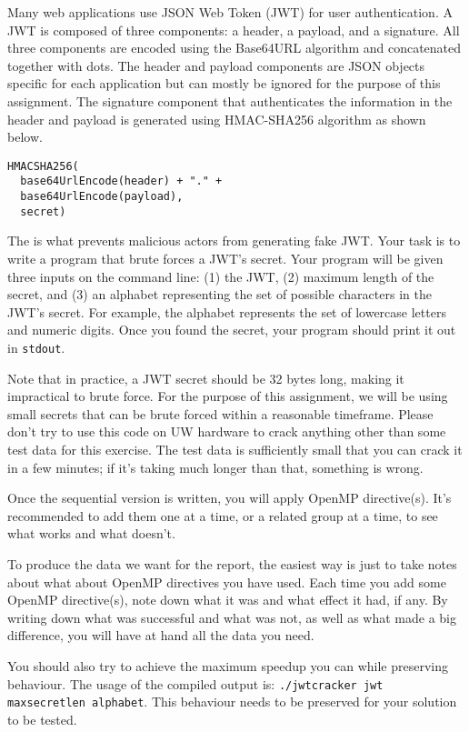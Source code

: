 \documentclass[letterpaper,10pt]{article}
\begin{document}
Many web applications use JSON Web Token (JWT) for user authentication. A JWT is composed of three components: a header, a payload, and a signature. All three components are encoded using the Base64URL algorithm and concatenated together with dots. The header and payload components are JSON objects specific for each application but can mostly be ignored for the purpose of this assignment. The signature component that authenticates the information in the header and payload is generated using HMAC-SHA256 algorithm as shown below.

\begin{verbatim}
HMACSHA256(
  base64UrlEncode(header) + "." +
  base64UrlEncode(payload),
  secret)
\end{verbatim}

The  is what prevents malicious actors from generating fake JWT. Your task is to write a program that brute forces a JWT's secret. Your program will be given three inputs on the command line: (1) the JWT, (2) maximum length of the secret, and (3) an alphabet representing the set of possible characters in the JWT's secret. For example, the alphabet  represents the set of lowercase letters and numeric digits. Once you found the secret, your program should print it out in \texttt{stdout}.

Note that in practice, a JWT secret should be 32 bytes long, making it impractical to brute force. For the purpose of this assignment, we will be using small secrets that can be brute forced within a reasonable timeframe. Please don't try to use this code on UW hardware to crack anything other than some test data for this exercise. The test data is sufficiently small that you can crack it in a few minutes; if it's taking much longer than that, something is wrong.

Once the sequential version is written, you will apply OpenMP directive(s). It's recommended to add them one at a time, or a related group at a time, to see what works and what doesn't. 

To produce the data we want for the report, the easiest way is just to take notes about what about OpenMP directives you have used. Each time you add some OpenMP directive(s), note down what it was and what effect it had, if any. By writing down what was successful and what was not, as well as what made a big difference, you will have at hand all the data you need.

You should also try to achieve the maximum speedup you can while preserving behaviour. The usage of the compiled output is: \texttt{./jwtcracker jwt maxsecretlen alphabet}. This behaviour needs to be preserved for your solution to be tested.
\end{document}
